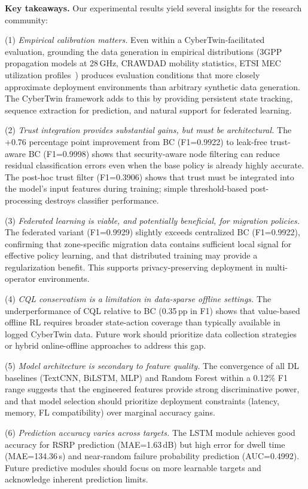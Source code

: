 \documentclass[10pt,letterpaper]{article}
\begin{document}
\textbf{Key takeaways.} Our experimental results yield several insights for the research community:

(1) \textit{Empirical calibration matters.} Even within a CyberTwin-facilitated evaluation, grounding the data generation in empirical distributions (3GPP propagation models at 28\,GHz, CRAWDAD mobility statistics, ETSI MEC utilization profiles~\cite{etsi_mec003}) produces evaluation conditions that more closely approximate deployment environments than arbitrary synthetic data generation. The CyberTwin framework adds to this by providing persistent state tracking, sequence extraction for prediction, and natural support for federated learning.

(2) \textit{Trust integration provides substantial gains, but must be architectural.} The +0.76 percentage point improvement from BC (F1=0.9922) to leak-free trust-aware BC (F1=0.9998) shows that security-aware node filtering can reduce residual classification errors even when the base policy is already highly accurate. The post-hoc trust filter (F1=0.3906) shows that trust must be integrated into the model's input features during training; simple threshold-based post-processing destroys classifier performance.

(3) \textit{Federated learning is viable, and potentially beneficial, for migration policies.} The federated variant (F1=0.9929) slightly exceeds centralized BC (F1=0.9922), confirming that zone-specific migration data contains sufficient local signal for effective policy learning, and that distributed training may provide a regularization benefit. This supports privacy-preserving deployment in multi-operator environments.

(4) \textit{CQL conservatism is a limitation in data-sparse offline settings.} The underperformance of CQL relative to BC (0.35\,pp in F1) shows that value-based offline RL requires broader state-action coverage than typically available in logged CyberTwin data. Future work should prioritize data collection strategies or hybrid online-offline approaches to address this gap.

(5) \textit{Model architecture is secondary to feature quality.} The convergence of all DL baselines (TextCNN, BiLSTM, MLP) and Random Forest within a 0.12\% F1 range suggests that the engineered features provide strong discriminative power, and that model selection should prioritize deployment constraints (latency, memory, FL compatibility) over marginal accuracy gains.

(6) \textit{Prediction accuracy varies across targets.} The LSTM module achieves good accuracy for RSRP prediction (MAE=1.63\,dB) but high error for dwell time (MAE=134.36\,s) and near-random failure probability prediction (AUC=0.4992). Future predictive modules should focus on more learnable targets and acknowledge inherent prediction limits.
\end{document}
